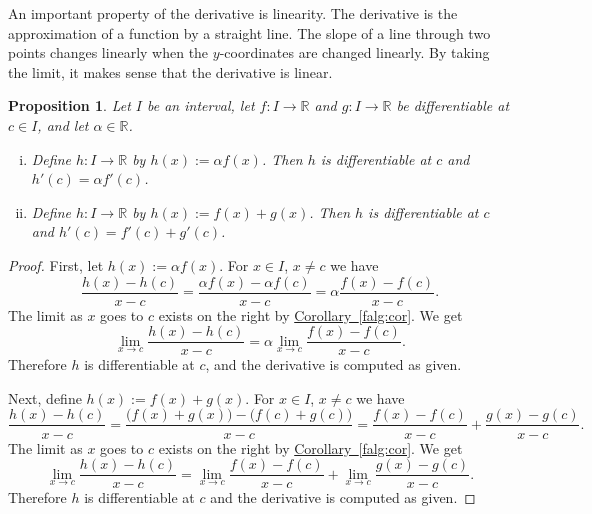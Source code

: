 \documentclass[12pt]{book}
\newcommand{\R}{{\mathbb{R}}}
\theoremstyle{plain}
\newtheorem{prop}[thm]{Proposition}
\theoremstyle{remark}
\theoremstyle{definition}
\theoremstyle{exercise}
\theoremstyle{example}
\newcommand{\corref}[1]{\hyperref[#1]{Corollary~\ref*{#1}}}
\begin{document}
An important property of the derivative is linearity.  The
derivative is the approximation of a function by a straight line.
The slope of a line through two points changes linearly when the
$y$-coordinates are changed linearly.  By taking the limit,
it makes sense that the derivative is linear.

\begin{prop}
Let $I$ be an interval, let
$f \colon I \to \R$ and $g \colon I \to \R$ be differentiable at $c \in I$,
and let $\alpha \in \R$.
\begin{enumerate}[(i)]
\item
Define $h \colon I \to \R$ by $h(x) := \alpha f(x)$.  Then
$h$ is differentiable at $c$ and
$h'(c) = \alpha f'(c)$.
\item
Define $h \colon I \to \R$ by $h(x) :=  f(x) + g(x)$.  Then
$h$ is differentiable at $c$ and
$h'(c) =  f'(c) + g'(c)$.
\end{enumerate}
\end{prop}

\begin{proof}
First, let $h(x) := \alpha f(x)$.
For $x \in I$, $x \not= c$ we have
\begin{equation*}
\frac{h(x)-h(c)}{x-c} =
\frac{\alpha f(x) - \alpha f(c)}{x-c}
=
\alpha \frac{f(x) - f(c)}{x-c} .
\end{equation*}
The limit as $x$ goes to $c$ exists on the right
by \corref{falg:cor}.  We get
\begin{equation*}
\lim_{x\to c}\frac{h(x)-h(c)}{x-c} =
\alpha \lim_{x\to c} \frac{f(x) - f(c)}{x-c} .
\end{equation*}
Therefore $h$ is differentiable at $c$,
and the derivative is computed as given.

Next, define $h(x) := f(x)+g(x)$.
For $x \in I$, $x \not= c$ we have
\begin{equation*}
\frac{h(x)-h(c)}{x-c} =
\frac{\bigl(f(x) + g(x)\bigr) - \bigl(f(c) + g(c)\bigr)}{x-c}
=
\frac{f(x) - f(c)}{x-c}
+
\frac{g(x) - g(c)}{x-c} .
\end{equation*}
The limit as $x$ goes to $c$ exists on the right
by \corref{falg:cor}.  We get
\begin{equation*}
\lim_{x\to c}\frac{h(x)-h(c)}{x-c} =
\lim_{x\to c} \frac{f(x) - f(c)}{x-c}
+
\lim_{x\to c}\frac{g(x) - g(c)}{x-c} .
\end{equation*}
Therefore $h$ is differentiable at $c$
and the derivative is computed as given.
\end{proof}
\end{document}

